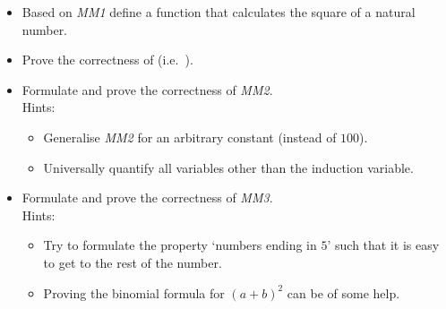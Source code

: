 \begin{isabellebody}
\begin{isamarkuptext}
\begin{itemize}
\item Based on {\em MM1} define a function  that calculates the square of a natural number.
\item Prove the correctness of  (i.e.\ ).
\item Formulate and prove the correctness of {\em MM2}.\\ Hints:
  \begin{itemize}
  \item Generalise {\em MM2} for an arbitrary constant (instead of $100$).
  \item Universally quantify all variables other than the induction variable.
\end{itemize}
\item Formulate and prove the correctness of {\em MM3}.\\ Hints:
  \begin{itemize}
  \item Try to formulate the property `numbers ending in $5$' such that it is easy to get to the rest of the number.
  \item Proving the binomial formula for $(a+b)^2$ can be of some help.
  \end{itemize}
\end{itemize}%
\end{isamarkuptext}%
\isamarkuptrue%
\isamarkupfalse%
\end{isabellebody}%

